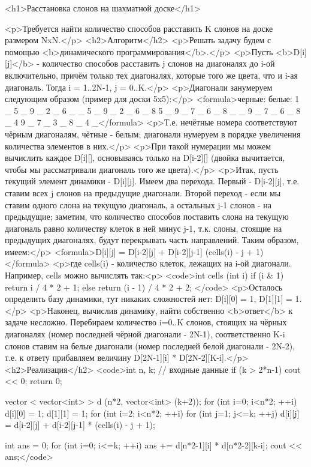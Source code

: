<h1>Расстановка слонов на шахматной доске</h1>

<p>Требуется найти количество способов расставить K слонов на доске размером NxN.</p>
<h2>Алгоритм</h2>
<p>Решать задачу будем с помощью <b>динамического программирования</b>.</p>
<p>Пусть <b>D[i][j]</b> - количество способов расставить j слонов на диагоналях до i-ой включительно, причём только тех диагоналях, которые того же цвета, что и i-ая диагональ. Тогда i = 1..2N-1, j = 0..K.</p>
<p>Диагонали занумеруем следующим образом (пример для доски 5x5):</p>
<formula>черные:     белые:
1 _ 5 _ 9   _ 2 _ 6 _
_ 5 _ 9 _   2 _ 6 _ 8
5 _ 9 _ 7   _ 6 _ 8 _ 
_ 9 _ 7 _   6 _ 8 _ 4
9 _ 7 _ 3   _ 8 _ 4 _</formula>
<p>Т.е. нечётные номера соответствуют чёрным диагоналям, чётные - белым; диагонали нумеруем в порядке увеличения количества элементов в них.</p>
<p>При такой нумерации мы можем вычислить каждое D[i][], основываясь только на D[i-2][] (двойка вычитается, чтобы мы рассматривали диагональ того же цвета).</p>
<p>Итак, пусть текущий элемент динамики - D[i][j]. Имеем два перехода. Первый - D[i-2][j], т.е. ставим всех j слонов на предыдущие диагонали. Второй переход - если мы ставим одного слона на текущую диагональ, а остальных j-1 слонов - на предыдущие; заметим, что количество способов поставить слона на текущую диагональ равно количеству клеток в ней минус j-1, т.к. слоны, стоящие на предыдущих диагоналях, будут перекрывать часть направлений. Таким образом, имеем:</p>
<formula>D[i][j] = D[i-2][j] + D[i-2][j-1] (cells(i) - j + 1)</formula>
<p>где cells(i) - количество клеток, лежащих на i-ой диагонали. Например, cells можно вычислять так:<p>
<code>int cells (int i) {
	if (i & 1)
		return i / 4 * 2 + 1;
	else
		return (i - 1) / 4 * 2 + 2;
}</code>
<p>Осталось определить базу динамики, тут никаких сложностей нет: D[i][0] = 1, D[1][1] = 1.</p>
<p>Наконец, вычислив динамику, найти собственно <b>ответ</b> к задаче несложно. Перебираем количество i=0..K слонов, стоящих на чёрных диагоналях (номер последней чёрной диагонали - 2N-1), соответственно K-i слонов ставим на белые диагонали (номер последней белой диагонали - 2N-2), т.е. к ответу прибавляем величину D[2N-1][i] * D[2N-2][K-i].</p>
<h2>Реализация</h2>
<code>int n, k; // входные данные
if (k > 2*n-1) {
	cout << 0;
	return 0;
}

vector < vector<int> > d (n*2, vector<int> (k+2));
for (int i=0; i<n*2; ++i)
	d[i][0] = 1;
d[1][1] = 1;
for (int i=2; i<n*2; ++i)
	for (int j=1; j<=k; ++j)
		d[i][j] = d[i-2][j] + d[i-2][j-1] * (cells(i) - j + 1);

int ans = 0;
for (int i=0; i<=k; ++i)
	ans += d[n*2-1][i] * d[n*2-2][k-i];
cout << ans;</code>